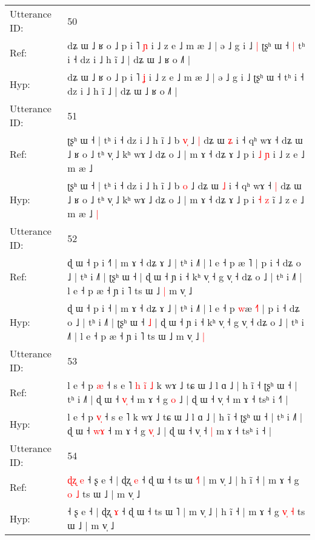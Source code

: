 \documentclass[10pt]{article}
\DeclareRobustCommand{\hl}[1]{{\textcolor{red}{#1}}}
\begin{document}
\begin{longtable}{ll}
 \\
\midrule
Utterance ID: & 50 \\
Ref: & dʑ ɯ ˩ ʁ o ˩ p i ˥ \hl{ɲ} i ˩ z e ˩ m æ ˩ | ə ˩ g i ˩\hl{ }\hl{|} ʈʂʰ ɯ ˧\hl{ }\hl{|} tʰ i ˧ dz i ˩ h ĩ ˩ | dʑ ɯ ˩ ʁ o ˩˥ |
 \\
Hyp: & dʑ ɯ ˩ ʁ o ˩ p i ˥ \hl{ʝ} i ˩ z e ˩ m æ ˩ | ə ˩ g i ˩\hl{}\hl{} ʈʂʰ ɯ ˧\hl{}\hl{} tʰ i ˧ dz i ˩ h ĩ ˩ | dʑ ɯ ˩ ʁ o ˩˥ |
 \\
\midrule
Utterance ID: & 51 \\
Ref: & ʈʂʰ ɯ ˧ | tʰ i ˧ dz i ˩ h ĩ ˩ b \hl{v}\hl{̩} ˩\hl{ }\hl{|} dʑ ɯ \hl{ʑ} i ˧ qʰ wɤ ˧\hl{}\hl{} dʑ ɯ ˩ ʁ o ˩ tʰ v̩ ˩ kʰ wɤ ˩ dʑ o ˩ | m ɤ ˧ dʑ ɤ ˩ p i \hl{˩} \hl{ɲ} i\hl{} ˩ z e ˩ m æ ˩\hl{}\hl{}
 \\
Hyp: & ʈʂʰ ɯ ˧ | tʰ i ˧ dz i ˩ h ĩ ˩ b \hl{}\hl{o} ˩\hl{}\hl{} dʑ ɯ \hl{˩} i ˧ qʰ wɤ ˧\hl{ }\hl{|} dʑ ɯ ˩ ʁ o ˩ tʰ v̩ ˩ kʰ wɤ ˩ dʑ o ˩ | m ɤ ˧ dʑ ɤ ˩ p i \hl{˧} \hl{z} i\hl{̃} ˩ z e ˩ m æ ˩\hl{ }\hl{|}
 \\
\midrule
Utterance ID: & 52 \\
Ref: & ɖ ɯ ˧ p i ˧\hl{˥} | m ɤ ˧ dʑ ɤ ˩ | tʰ i ˩˥ | l e ˧ p \hl{}æ \hl{}˥ | p i ˧ dʑ o ˩ | tʰ i ˩˥ | ʈʂʰ ɯ ˧\hl{}\hl{} | ɖ ɯ ˧ ɲ i ˧ kʰ v̩ ˧ g v̩ ˧ dʑ o ˩ | tʰ i ˩˥ | l e ˧ p æ ˧ ɲ i ˥ ts ɯ ˩\hl{ }\hl{|} m v̩ ˩\hl{}\hl{}
 \\
Hyp: & ɖ ɯ ˧ p i ˧\hl{} | m ɤ ˧ dʑ ɤ ˩ | tʰ i ˩˥ | l e ˧ p \hl{w}æ \hl{˧}˥ | p i ˧ dʑ o ˩ | tʰ i ˩˥ | ʈʂʰ ɯ ˧\hl{ }\hl{˩} | ɖ ɯ ˧ ɲ i ˧ kʰ v̩ ˧ g v̩ ˧ dʑ o ˩ | tʰ i ˩˥ | l e ˧ p æ ˧ ɲ i ˥ ts ɯ ˩\hl{}\hl{} m v̩ ˩\hl{ }\hl{|}
 \\
\midrule
Utterance ID: & 53 \\
Ref: & l e ˧ p \hl{}\hl{æ} ˧ s e ˥\hl{ }\hl{h}\hl{ }\hl{i}\hl{̃}\hl{ }\hl{˩} k wɤ ˩ tɕ ɯ ˩ l ɑ ˩ | h ĩ ˧ ʈʂʰ ɯ ˧ | tʰ i ˩˥ | ɖ ɯ ˧ \hl{v}\hl{̩} ˧ m ɤ ˧ g \hl{}\hl{o} ˩ | ɖ ɯ ˧ v̩ ˧\hl{}\hl{} m ɤ ˧ tsʰ i ˧\hl{˥} |
 \\
Hyp: & l e ˧ p \hl{v}\hl{̩} ˧ s e ˥\hl{}\hl{}\hl{}\hl{}\hl{}\hl{}\hl{} k wɤ ˩ tɕ ɯ ˩ l ɑ ˩ | h ĩ ˧ ʈʂʰ ɯ ˧ | tʰ i ˩˥ | ɖ ɯ ˧ \hl{w}\hl{ɤ} ˧ m ɤ ˧ g \hl{v}\hl{̩} ˩ | ɖ ɯ ˧ v̩ ˧\hl{ }\hl{|} m ɤ ˧ tsʰ i ˧\hl{} |
 \\
\midrule
Utterance ID: & 54 \\
Ref: & \hl{ɖ}\hl{ʐ}\hl{ }\hl{e}\hl{ }˧ ʂ e ˧ | ɖʐ \hl{e} ˧ ɖ ɯ ˧ ts ɯ \hl{˧}˥ | m v̩ ˩ | h ĩ ˧ | m ɤ ˧ g \hl{}\hl{o} \hl{˩} ts ɯ ˩ | m v̩ ˩
 \\
Hyp: & \hl{}\hl{}\hl{}\hl{}\hl{}˧ ʂ e ˧ | ɖʐ \hl{ɤ} ˧ ɖ ɯ ˧ ts ɯ \hl{}˥ | m v̩ ˩ | h ĩ ˧ | m ɤ ˧ g \hl{v}\hl{̩} \hl{˧} ts ɯ ˩ | m v̩ ˩

\end{longtable}
\end{document}
